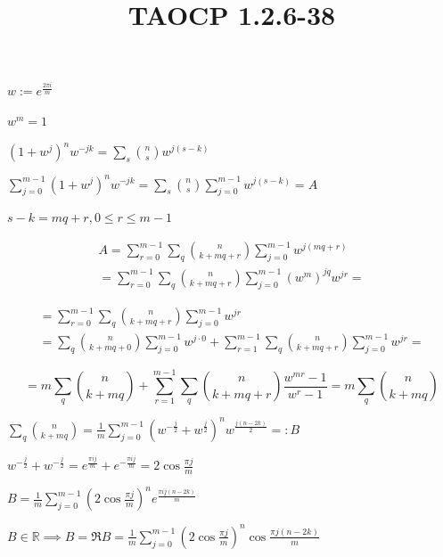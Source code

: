 \documentclass{article}
\title{TAOCP 1.2.6\mbox{-}38}
\begin{document}
\maketitle

\( w := e^{\frac{2 \pi i}{m}} \)

\( w^{m} = 1 \)

\( {(1+w^{j})}^{n} w^{-jk} = \sum_{s} \binom{n}{s} w^{j(s-k)} \)

\( \sum_{j=0}^{m-1} {(1+w^{j})}^{n} w^{-jk} = \sum_{s} \binom{n}{s} \sum_{j=0}^{m-1} w^{j(s-k)} = A \)

\( s-k = mq + r, 0 \leq r \leq m - 1 \)

\begin{multline*}
A = \sum_{r=0}^{m-1} \sum_{q} \binom{n}{k + mq + r} \sum_{j=0}^{m-1} w^{j(mq+r)} \\
= \sum_{r=0}^{m-1} \sum_{q} \binom{n}{k + mq + r} \sum_{j=0}^{m-1} {(w^{m})}^{jq}w^{jr} =
\end{multline*}

\begin{multline*}
= \sum_{r=0}^{m-1} \sum_{q} \binom{n}{k + mq + r} \sum_{j=0}^{m-1} w^{jr} \\
= \sum_{q} \binom{n}{k + mq + 0} \sum_{j=0}^{m-1} w^{j \cdot 0} + \sum_{r=1}^{m-1} \sum_{q} \binom{n}{k + mq + r} \sum_{j=0}^{m-1} w^{jr} =
\end{multline*}

\[ = m \sum_{q} \binom{n}{k + mq} + \sum_{r=1}^{m-1} \sum_{q} \binom{n}{k + mq + r} \frac{w^{mr} - 1}{w^{r} - 1} = m \sum_{q} \binom{n}{k + mq} \]

\( \sum_{q} \binom{n}{k+mq} = \frac{1}{m} \sum_{j=0}^{m-1} {(w^{-\frac{j}{2}}+w^{\frac{j}{2}})}^{n} w^{\frac{j(n-2k)}{2}} =: B \)

\( w^{-\frac{j}{2}} + w^{-\frac{j}{2}} = e^{\frac{\pi i j}{m}} + e^{-\frac{\pi i j}{m}} = 2 \cos \frac{\pi j}{m} \)

\( B = \frac{1}{m} \sum_{j=0}^{m-1} {(2 \cos \frac{\pi j}{m})}^{n} e^{\frac{\pi i j(n-2k)}{m}} \)

\( B \in \mathbb{R} \implies B = \Re B = \frac{1}{m} \sum_{j=0}^{m-1} {(2 \cos \frac{\pi j}{m})}^{n} \cos \frac{\pi j(n-2k)}{m} \)
\end{document}
